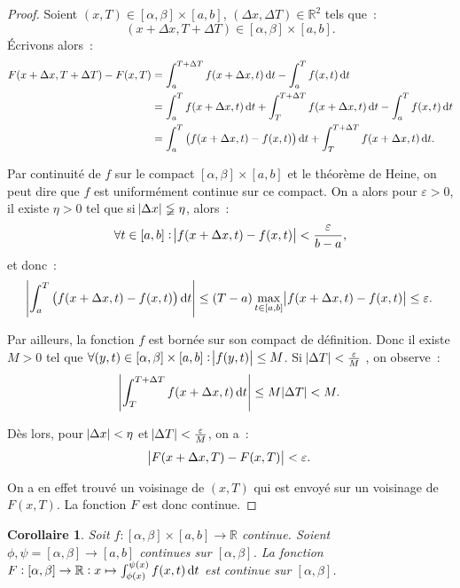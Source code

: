 \documentclass{report}
\newtheorem{cor}[thm]{Corollaire}
\theoremstyle{definition}
\theoremstyle{remark}
\newcommand{\R}{\mathbb R}
\begin{document}
			\begin{proof} Soient $(x, T) \in [\alpha, \beta] \times [a, b]$, $(\Delta x, \Delta T) \in \R^2$ tels que~:
			\[(x + \Delta x, T + \Delta T) \in [\alpha, \beta] \times [a, b].\]
			Écrivons alors~:
			\begin{align*}
				F(x + \Delta x, T + \Delta T) - F(x, T) &= \int_a^{T+\Delta T}f(x+\Delta x, t)\dif t - \int_a^Tf(x, t)\dif t \\
				&= \int_a^Tf(x+\Delta x, t)\dif t + \int_T^{T+\Delta T}f(x +\Delta x, t)\dif t - \int_a^Tf(x, t)\dif t \\
				&= \int_a^T\left(f(x+\Delta x, t) - f(x, t)\right)\dif t + \int_T^{T + \Delta T}f(x+\Delta x, t)\dif t.
			\end{align*}

			Par continuité de $f$ sur le compact $[\alpha, \beta] \times [a, b]$ et le théorème de Heine, on peut dire que $f$ est uniformément continue sur
			ce compact. On a alors pour $\varepsilon > 0$, il existe $\eta > 0$ tel que si $\abs {\Delta x} \lneqq \eta$, alors~:
			\[\forall t \in [a, b] : \abs {f(x+\Delta x, t) - f(x, t)} < \frac \varepsilon{b-a},\]
			et donc~:
			\[\abs {\int_a^T\left(f(x+\Delta x, t) - f(x, t)\right)\dif t} \leq (T-a)\max_{t \in [a, b]}\abs {f(x+\Delta x, t) - f(x, t)} \leq \varepsilon.\]

			Par ailleurs, la fonction $f$ est bornée sur son compact de définition. Donc il existe $M > 0$ tel que
			$\forall (y, t) \in [\alpha, \beta] \times [a, b] : \abs {f(y, t)} \leq M$. Si $\abs {\Delta T} < \frac \varepsilon M$ , on observe~:
			\[\abs {\int_T^{T + \Delta T}f(x + \Delta x, t)\dif t} \leq M\abs {\Delta T} < M.\]

			Dès lors, pour $\abs {\Delta x} < \eta$ et $\abs {\Delta T} < \frac \varepsilon M$, on a~:
			\[\abs {F(x+\Delta x, T) - F(x, T)} < \varepsilon.\]

			On a en effet trouvé un voisinage de $(x, T)$ qui est envoyé sur un voisinage de $F(x, T)$. La fonction $F$ est donc continue.
			\end{proof}

			\begin{cor} Soit $f : [\alpha, \beta] \times [a, b] \to \R$ continue. Soient $\phi, \psi = [\alpha, \beta] \to [a, b]$ continues sur $[\alpha, \beta]$.
			La fonction $F : [\alpha, \beta] \to \R : x \mapsto \int_{\phi(x)}^{\psi(x)}f(x, t)\dif t$ est continue sur $[\alpha, \beta]$.
			\end{cor}
\end{document}
